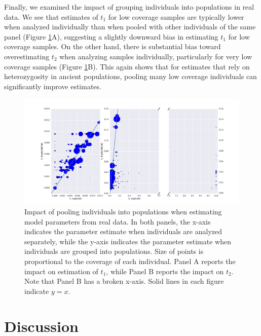 \documentclass[11pt, oneside]{article}   	%
\begin{document}
Finally, we examined the impact of grouping individuals into populations in real data.  We see that estimates of $t_1$ for low coverage samples are typically lower when analyzed individually than when pooled with other individuals of the same panel (Figure \ref{sep_vs_pops}A), suggesting a slightly downward bias in estimating $t_1$ for low coverage samples. On the other hand, there is substantial bias toward overestimating $t_2$ when analyzing samples individually, particularly for very low coverage samples (Figure \ref{sep_vs_pops}B). This again shows that for estimates that rely on heterozygosity in ancient populations, pooling many low coverage individuals can significantly improve estimates.

\begin{figure}[h] %
   \centering
   \includegraphics[width=\textwidth]{sep_vs_pops.pdf} 
   \caption{Impact of pooling individuals into populations when estimating model parameters from real data. In both panels, the x-axis indicates the parameter estimate when individuals are analyzed separately, while the y-axis indicates the parameter estimate when individuals are grouped into populations. Size of points is proportional to the coverage of each individual. Panel A reports the impact on estimation of $t_1$, while Panel B reports the impact on $t_2$. Note that Panel B has a broken x-axis. Solid lines in each figure indicate $y = x$.}
   \label{sep_vs_pops}
\end{figure}

\section{Discussion}
\end{document}
